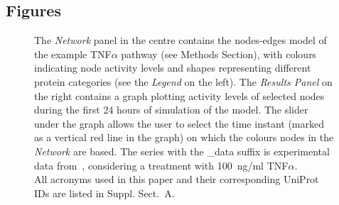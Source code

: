 \documentclass{bmcart}
\begin{document}
\begin{backmatter}









% 
\clearpage
\section*{Figures}
%








\begin{figure}[htbp]
\begin{center}
\end{center}
\caption{
The \emph{Network} panel in the centre contains the nodes-edges
model of the example TNF$\alpha$ pathway (see Methods Section), with
colours indicating node activity levels and shapes representing different protein categories (see the \emph{Legend} on the left).
The \emph{Results Panel} on the right contains a graph plotting activity levels of selected nodes
during the first 24 hours of simulation of the model. The slider under the graph
allows the user to select the time instant (marked as a vertical red line in the graph) on which
the colours nodes in the \emph{Network} are based.
The series with the {\sf \_data} suffix is experimental
data from~\cite{pathway-compendium}, considering a treatment with 100~ng/ml TNF$\alpha$.\\
All acronyms used in this paper
and their corresponding UniProt IDs are listed in Suppl. Sect.~A. %
\label{fig:cytoscape}}
\end{figure}


\end{backmatter}
\end{document}
